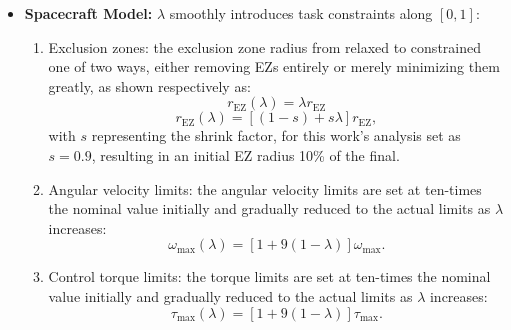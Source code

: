 \begin{itemize}
    \item \textbf{Spacecraft Model:} 
    $\lambda$ smoothly introduces task constraints along $[0,1]$:
    \begin{enumerate}
        \item Exclusion zones: the exclusion zone radius from relaxed to constrained one of two ways, either removing \ac{EZ}s entirely or merely minimizing them greatly, as shown respectively as:
        \begin{equation}
            r_{\text{EZ}}(\lambda) = \lambda r_{\text{EZ}} 
        \end{equation}
        \begin{equation}
            r_{\text{EZ}}(\lambda) = [(1-s)+s\lambda]r_{\text{EZ}},
        \end{equation}
        with $s$ representing the shrink factor, for this work's analysis set as $s = 0.9$, resulting in an initial \ac{EZ} radius 10\% of the final.           
        \item Angular velocity limits: the angular velocity limits are set at ten-times the nominal value initially and gradually reduced to the actual limits as $\lambda$ increases:
            \begin{equation}
                \omega_{\max}(\lambda) = [1+9(1-\lambda)]\omega_{\max}.
            \end{equation}
        \item Control torque limits: the torque limits are set at ten-times the nominal value initially and gradually reduced to the actual limits as $\lambda$ increases:
            \begin{equation}
                \tau_{\max}(\lambda) = [1+9(1-\lambda)]\tau_{\max}.
            \end{equation} 
    \end{enumerate}


\end{itemize}
